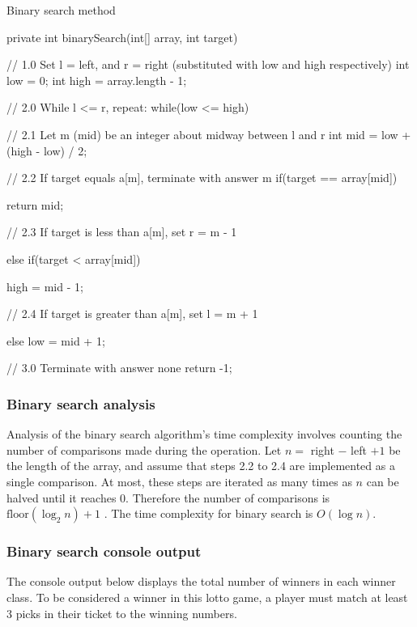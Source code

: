 \begin{listing}[H]
\caption{Binary search method}
\begin{javacode}
private int binarySearch(int[] array, int target) {

    // 1.0 Set l = left, and r = right (substituted with low and high respectively)
    int low = 0;
    int high = array.length - 1;

    // 2.0 While l <= r, repeat:
    while(low <= high) {

        // 2.1 Let m (mid) be an integer about midway between l and r
        int mid = low + (high - low) / 2;

        // 2.2 If target equals a[m], terminate with answer m
        if(target == array[mid]) {
            return mid;

        // 2.3 If target is less than a[m], set r = m - 1
        } else if(target < array[mid]) {
            high = mid - 1;

        // 2.4 If target is greater than a[m], set l = m + 1
        } else {
            low = mid + 1;
        }
    }

    // 3.0 Terminate with answer none
    return -1;
}
\end{javacode}
\end{listing}

\subsubsection{Binary search analysis}

Analysis of the binary search algorithm's time complexity involves counting the number of comparisons made during the operation. Let $n =$ right $-$ left $+ 1$ be the length of the array, and assume that steps 2.2 to 2.4 are implemented as a single comparison. At most, these steps are iterated as many times as $n$ can be halved until it reaches 0. Therefore the number of comparisons is $\mbox{floor}(\log_2n) + 1$ \citep{Watt2001}. The time complexity for binary search is $O(\log n)$.

\newpage
\subsubsection{Binary search console output}

The console output below displays the total number of winners in each winner class. To be considered a winner in this lotto game, a player must match at least 3 picks in their ticket to the winning numbers.

